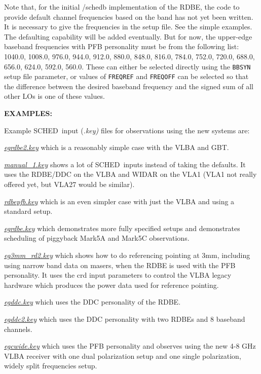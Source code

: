\documentclass{report}
\newcommand{\schedb}{{\sc SCHED~}}
\begin{document}
Note that, for the initial /schedb implementation of the RDBE, the
code to provide default channel frequencies based on the band has not
yet been written.  It is necessary to give the frequencies in the
setup file.  See the simple examples.  The defaulting capability will
be added eventually.  But for now, the upper-edge baseband frequencies
with PFB personality must be from the following list: 1040.0, 1008.0,
976.0, 944.0, 912.0, 880.0, 848.0, 816.0, 784.0, 752.0, 720.0, 688.0,
656.0, 624.0, 592.0, 560.0.  These can either be selected directly
using the {\tt BBSYN} setup file parameter, or values of {\tt FREQREF}
and {\tt FREQOFF} can be selected so that the difference between the
desired baseband frequency and the signed sum of all other LOs is one
of these values.

{\bf EXAMPLES:}

Example \schedb input {(\sl .key)} files for observations using the
new systems are: 

{\href{examples/egrdbe2.key}{{\sl egrdbe2.key}}} which is
a reasonably simple case with the VLBA and GBT.

{\href{examples/manual\_1.key}{{\sl manual\_1.key}}} shows
a lot of \schedb inputs instead of taking the defaults.  It uses
the RDBE/DDC on the VLBA and WIDAR on the VLA1 (VLA1 not really offered
yet, but VLA27 would be similar).

{\href{examples/rdbepfb.key}{{\sl rdbepfb.key}}} which is
an even simpler case with just the VLBA and using a standard setup.

{\href{examples/egrdbe.key}{{\sl egrdbe.key}}}
which demonstrates
more fully specified setups and demonstrates scheduling of piggyback
Mark5A and Mark5C observations.

{\href{examples/eg3mm\_rd2.key}{{\sl eg3mm\_rd2.key}}} which
shows how to do referencing pointing at 3mm, including using narrow
band data on masers, when the RDBE is used with the PFB personality.
It uses the crd input parameters to control the VLBA legacy hardware
which produces the power data used for reference pointing.

{\href{examples/egddc.key}{{\sl egddc.key}}} which uses the
DDC personality of the RDBE.

{\href{examples/egddc2.key}{{\sl egddc2.key}}} which uses the
DDC personality with two RDBEs and 8 baseband channels.

{\href{examples/egcwide.key}{{\sl egcwide.key}}} which uses the
PFB personality and observes using the new 4-8 GHz VLBA receiver with
one dual polarization setup and one single polarization, widely 
split frequencies setup.
\end{document}
